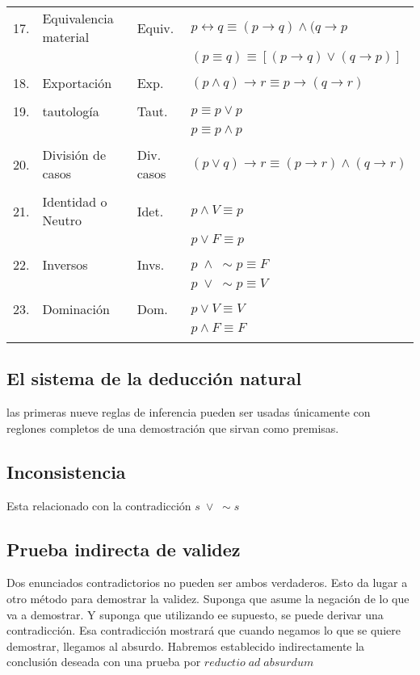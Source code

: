 \documentclass[10pt]{book} 						%
\begin{document}
\begin{center}
\begin{tabular}{c l l l}
17.&Equivalencia material&Equiv.&$p \leftrightarrow q \equiv (p \rightarrow q)\land (q \rightarrow p$\\

&&&$(p \equiv q) \equiv \left[(p \rightarrow q) \lor (q \rightarrow p)\right]$\\\\

18.&Exportación&Exp.&$(p \land  q)\rightarrow r \equiv p \rightarrow (q \rightarrow r) $\\\\
19.&tautología&Taut.&$p \equiv p \lor p$\\
&&&$p \equiv p \land p$\\\\

20.&División de casos&Div. casos&$(p \lor q ) \rightarrow r \equiv (p \rightarrow r)\land(q \rightarrow r) $\\\\

21.&Identidad o Neutro&Idet.&$p \land V \equiv p$\\
&&&$p \lor F \equiv p$\\\\

22.&Inversos&Invs.&$p \; \land \; \sim p \equiv F $\\
&&&$p \; \lor \; \sim p \equiv V$\\\\

23.&Dominación&Dom.&$p \lor V \equiv V$\\
&&&$p \land F \equiv F$\\\\ 

\end{tabular}
\end{center}

\subsection{El sistema de la deducción natural}
las primeras nueve reglas de inferencia pueden ser usadas únicamente con reglones completos de una demostración que sirvan como premisas.

\subsection{Inconsistencia}
Esta relacionado con la contradicción $s \; \lor \; \sim s$

\subsection{Prueba indirecta de validez}
Dos enunciados contradictorios no pueden ser ambos verdaderos. Esto da lugar a otro método para demostrar la validez. Suponga que asume la negación de lo que va a demostrar. Y suponga que utilizando ee supuesto, se puede derivar una contradicción. Esa contradicción mostrará que cuando negamos lo que se quiere demostrar, llegamos al absurdo. Habremos establecido indirectamente la conclusión deseada con una prueba por $reductio \; ad \; absurdum$
\end{document}
